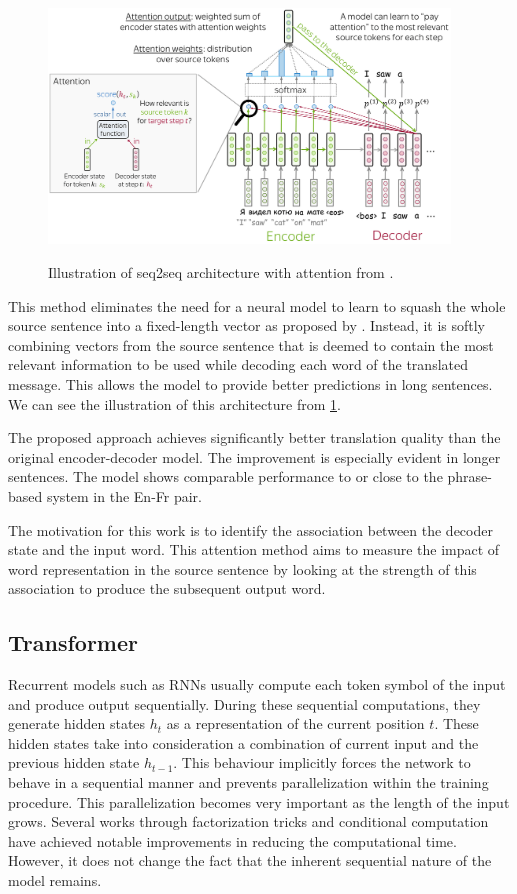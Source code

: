 \begin{figure}[h]
    {\includegraphics[width=0.95\textwidth]{img/attseq2seq.png}}
    \centering
    \caption{Illustration of seq2seq architecture with attention from .}
    \label{img:attseq2seq}
\end{figure}

This method eliminates the need for a neural model to learn to squash the whole source sentence into a fixed-length vector as proposed by . Instead, it is softly combining vectors from the source sentence that is deemed to contain the most relevant information to be used while decoding each word of the translated message. This allows the model to provide better predictions in long sentences. We can see the illustration of this architecture from \cref{img:attseq2seq}.

The proposed approach achieves significantly better translation quality than the original encoder-decoder model. The improvement is especially evident in longer sentences. The model shows comparable performance to or close to the phrase-based system in the En-Fr pair.

The motivation for this work is to identify the association between the decoder state and the input word. This attention method aims to measure the impact of word representation in the source sentence by looking at the strength of this association to produce the subsequent output word.

\subsection{Transformer}
\label{ssec:transformer}
Recurrent models such as RNNs usually compute each token symbol of the input and produce output sequentially. During these sequential computations, they generate hidden states $h_t$ as a representation of the current position $t$. These hidden states take into consideration a combination of current input and the previous hidden state $h_{t-1}$. This behaviour implicitly forces the network to behave in a sequential manner and prevents parallelization within the training procedure. This parallelization becomes very important as the length of the input grows. Several works through factorization tricks  and conditional computation  have achieved notable improvements in reducing the computational time. However, it does not change the fact that the inherent sequential nature of the model remains.

